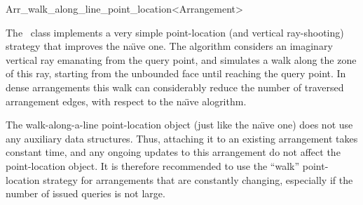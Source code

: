 
\ccRefPageBegin

\begin{ccRefClass}{Arr_walk_along_line_point_location<Arrangement>}
\label{arr_ref:walk_pl}

\ccDefinition

The \ccRefName\ class implements a very simple point-location (and 
vertical ray-shooting) strategy that improves the na\"{\i}ve one.
The algorithm considers an imaginary vertical ray emanating from the
query point, and simulates a walk along the zone of this ray, starting
from the unbounded face until reaching the query point.
In dense arrangements this walk can considerably reduce the number
of traversed arrangement edges, with respect to the na\"{\i}ve
alogrithm.

The walk-along-a-line point-location object (just like the na\"{\i}ve one)
does not use any auxiliary data structures. Thus, attaching it to an
existing arrangement takes constant time, and any ongoing updates to
this arrangement do not affect the point-location object.
It is therefore recommended to use the ``walk'' point-location strategy
for arrangements that are constantly changing, especially if the number
of issued queries is not large.


\ccIsModel
   \\

\end{ccRefClass}

\ccRefPageEnd

